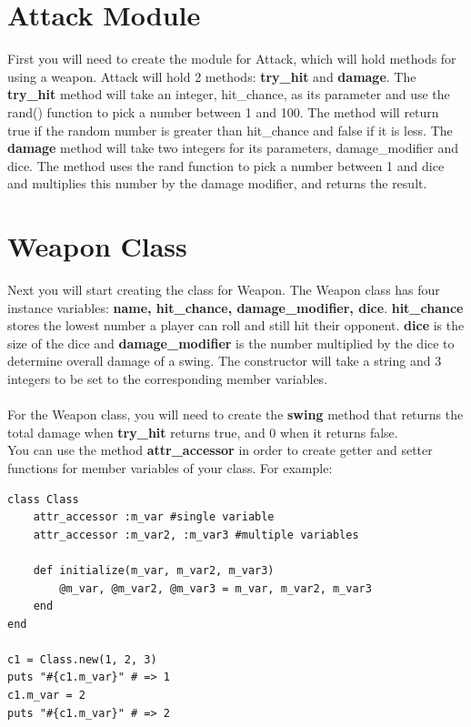 \documentclass{article}
\begin{document}
\section*{Attack Module}
First you will need to create the module for Attack, which will hold methods for using a weapon. Attack will hold 2 methods: \textbf{try\_hit} and \textbf{damage}. The \textbf{try\_hit} method will take an integer, hit\_chance, as its parameter and use the rand() function to pick a number between 1 and 100. The method will return true if the random number is greater than hit\_chance and false if it is less. The \textbf{damage} method will take two integers for its parameters, damage\_modifier and dice. The method uses the rand function to pick a number between 1 and dice and multiplies this number by the damage modifier, and returns the result.
\newpage

\section*{Weapon Class}
Next you will start creating the class for Weapon. The Weapon class has four instance variables: \textbf{name, hit\_chance, damage\_modifier, dice}. \textbf{hit\_chance} stores the lowest number a player can roll and still hit their opponent. \textbf{dice} is the size of the dice and \textbf{damage\_modifier} is the number multiplied by the dice to determine overall damage of a swing. The constructor will take a string and 3 integers to be set to the corresponding member variables. \\
\\
For the Weapon class, you will need to create the \textbf{swing} method that returns the total damage when \textbf{try\_hit} returns true, and 0 when it returns false. \\
You can use the method \textbf{attr\_accessor} in order to create getter and setter functions for member variables of your class. For example: \\
\begin{lstlisting}
class Class
	attr_accessor :m_var #single variable
    attr_accessor :m_var2, :m_var3 #multiple variables
    
    def initialize(m_var, m_var2, m_var3)
    	@m_var, @m_var2, @m_var3 = m_var, m_var2, m_var3
    end
end

c1 = Class.new(1, 2, 3)
puts "#{c1.m_var}" # => 1
c1.m_var = 2 
puts "#{c1.m_var}" # => 2
\end{lstlisting}
\end{document}
